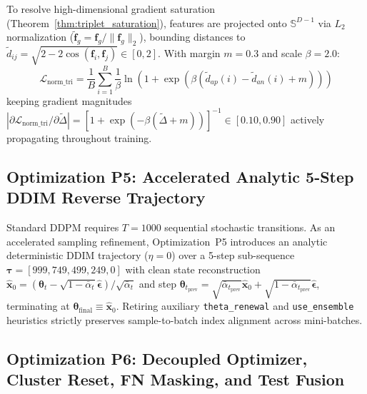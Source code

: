 To resolve high-dimensional gradient saturation (Theorem~\ref{thm:triplet_saturation}), features are projected onto $\mathbb{S}^{D-1}$ via $L_2$ normalization ($\tilde{\mathbf{f}}_g = \mathbf{f}_g / \|\mathbf{f}_g\|_2$), bounding distances to $\tilde{d}_{ij} = \sqrt{2 - 2\cos(\mathbf{f}_i, \mathbf{f}_j)} \in [0, 2]$. With margin $m=0.3$ and scale $\beta=2.0$:
\begin{equation}
\mathcal{L}_{\text{norm\_tri}} = \frac{1}{B}\sum_{i=1}^B \frac{1}{\beta}\ln\left(1 + \exp\left(\beta(\tilde{d}_{ap}(i) - \tilde{d}_{an}(i) + m)\right)\right)
\end{equation}
keeping gradient magnitudes $|\partial \mathcal{L}_{\text{norm\_tri}} / \partial \tilde{\Delta}| = [1 + \exp(-\beta(\tilde{\Delta} + m))]^{-1} \in [0.10, 0.90]$ actively propagating throughout training.

\subsection{Optimization P5: Accelerated Analytic 5-Step DDIM Reverse Trajectory}
\label{subsec:opt_p5}

Standard DDPM requires $T=1000$ sequential stochastic transitions. As an accelerated sampling refinement, Optimization~P5 introduces an analytic deterministic DDIM trajectory ($\eta=0$) over a 5-step sub-sequence $\boldsymbol{\tau} = [999, 749, 499, 249, 0]$ with clean state reconstruction $\hat{\mathbf{x}}_0 = (\boldsymbol{\theta}_t - \sqrt{1 - \bar{\alpha}_t}\hat{\boldsymbol{\epsilon}})/\sqrt{\bar{\alpha}_t}$ and step $\boldsymbol{\theta}_{t_{\text{prev}}} = \sqrt{\bar{\alpha}_{t_{\text{prev}}}}\hat{\mathbf{x}}_0 + \sqrt{1 - \bar{\alpha}_{t_{\text{prev}}}}\hat{\boldsymbol{\epsilon}}$, terminating at $\boldsymbol{\theta}_{\text{final}} \equiv \hat{\mathbf{x}}_0$. Retiring auxiliary \texttt{theta\_renewal} and \texttt{use\_ensemble} heuristics strictly preserves sample-to-batch index alignment across mini-batches.

\subsection{Optimization P6: Decoupled Optimizer, Cluster Reset, FN Masking, and Test Fusion}
\label{subsec:opt_p6}

